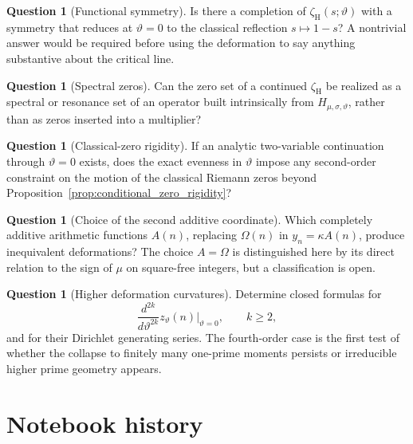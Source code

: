 \documentclass[11pt]{amsart}
\numberwithin{equation}{section}
\theoremstyle{plain}
\theoremstyle{definition}
\newtheorem{question}[theorem]{Question}
\theoremstyle{remark}
\newcommand{\Om}{\Omega}
\begin{document}
\begin{question}[Functional symmetry]
\label{q:functional_symmetry}
Is there a completion of $\zeta_{\mathrm H}(s;\vartheta)$ with a symmetry
that reduces at $\vartheta=0$ to the classical reflection $s\mapsto1-s$?
A nontrivial answer would be required before using the deformation to say
anything substantive about the critical line.
\end{question}

\begin{question}[Spectral zeros]
\label{q:spectral_zeros}
Can the zero set of a continued $\zeta_{\mathrm H}$ be realized as a spectral
or resonance set of an operator built intrinsically from
$H_{\mu,\sigma,\vartheta}$, rather than as zeros inserted into a multiplier?
\end{question}

\begin{question}[Classical-zero rigidity]
\label{q:classical_zero_rigidity}
If an analytic two-variable continuation through $\vartheta=0$ exists, does
the exact evenness in $\vartheta$ impose any second-order constraint on the
motion of the classical Riemann zeros beyond
Proposition~\ref{prop:conditional_zero_rigidity}?
\end{question}

\begin{question}[Choice of the second additive coordinate]
\label{q:additive_coordinate}
Which completely additive arithmetic functions $A(n)$, replacing $\Om(n)$
in $y_n=\kappa A(n)$, produce inequivalent deformations?  The choice
$A=\Om$ is distinguished here by its direct relation to the sign of $\mu$ on
square-free integers, but a classification is open.
\end{question}


\begin{question}[Higher deformation curvatures]
\label{q:higher_curvatures}
Determine closed formulas for
\begin{equation}
\frac{d^{2k}}{d\vartheta^{2k}}z_\vartheta(n)\Big|_{\vartheta=0},
\qquad k\ge2,
\label{eq:higher_curvature_derivatives}
\end{equation}
and for their Dirichlet generating series. The fourth-order case is the first
test of whether the collapse to finitely many one-prime moments persists or
irreducible higher prime geometry appears.
\end{question}

\section{Notebook history}
\label{sec:notebook_history}
\end{document}
